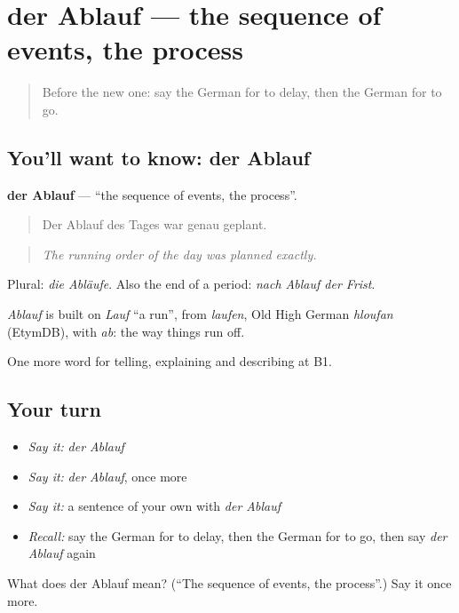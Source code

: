 \section[der Ablauf]{der Ablauf — the sequence of events, the process}

\label{lesson:GE-C270-ablauf}



\begin{quote}
Before the new one: say the German for to delay, then the German for to go.
\end{quote}

\subsection*{You'll want to know: der Ablauf}
\textbf{der Ablauf} — \textquotedblleft{}the sequence of events, the process\textquotedblright{}.

\begin{quote}
Der Ablauf des Tages war genau geplant.
\end{quote}

\begin{quote}
\emph{The running order of the day was planned exactly.}
\end{quote}

Plural: \emph{die Abläufe}. Also the end of a period: \emph{nach Ablauf der Frist}.

\begin{cousinweb}
\emph{Ablauf} is built on \emph{Lauf} \textquotedblleft{}a run\textquotedblright{}, from \emph{laufen}, Old High German \emph{hloufan} (EtymDB), with \emph{ab}: the way things run off.
\end{cousinweb}

\begin{grammarlens}[title={What you've built}]
One more word for telling, explaining and describing at B1.
\end{grammarlens}

\subsection*{Your turn}
\begin{itemize}
\raggedright
  \item \emph{Say it:} \emph{der Ablauf}
  \item \emph{Say it:} \emph{der Ablauf}, once more
  \item \emph{Say it:} a sentence of your own with \emph{der Ablauf}
  \item \emph{Recall:} say the German for to delay, then the German for to go, then say \emph{der Ablauf} again
\end{itemize}

\begin{tcolorbox}[breakable,colback=teal!4,colframe=teal!35!black,title={Before you move on}]
What does der Ablauf mean? (\textquotedblleft{}The sequence of events, the process\textquotedblright{}.) Say it once more.
\end{tcolorbox}

